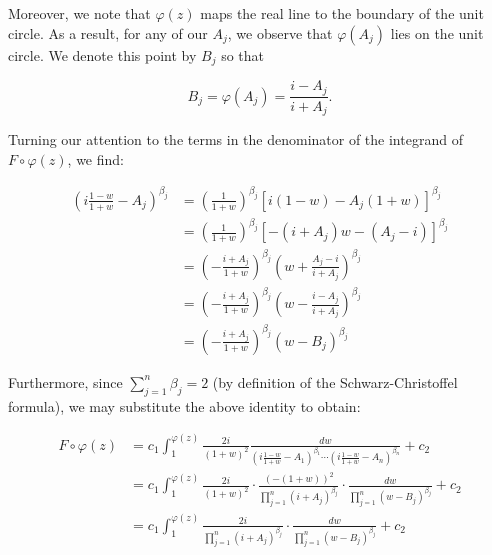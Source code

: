 \begin{solution}
  Moreover, we note that $\varphi(z)$ maps the real line to the boundary of the unit circle. As a result, for any of our 
  $A_j$, we observe that $\varphi(A_j)$ lies on the unit circle. We denote this point by $B_j$ so that

  $$
  B_j = \varphi(A_j) = \frac{i - A_j}{i + A_j}.
  $$

  \pagebreak
  Turning our attention to the terms in the denominator of the integrand of $F \circ \varphi(z)$, we find:

  \begin{align*}
    \left(i \frac{1-w}{1+w} - A_j\right)^{\beta_j} 
      &= \left(\frac{1}{1 + w}\right)^{\beta_j} \left[ i (1 - w) - A_j (1 + w) \right]^{\beta_j} \\
      &= \left(\frac{1}{1 + w}\right)^{\beta_j} \left[ -(i + A_j) w  - (A_j - i) \right]^{\beta_j} \\
      &= \left(-\frac{i + A_j}{1 + w}\right)^{\beta_j} \left( w  + \frac{A_j - i}{i + A_j} \right)^{\beta_j} \\
      &= \left(-\frac{i + A_j}{1 + w}\right)^{\beta_j} \left( w  - \frac{i - A_j}{i + A_j} \right)^{\beta_j} \\
      &= \left(-\frac{i + A_j}{1 + w}\right)^{\beta_j} \left( w  - B_j \right)^{\beta_j}
  \end{align*}

  Furthermore, since $\sum\limits_{j=1}^n \beta_j = 2$ (by definition of the Schwarz-Christoffel formula), we may 
  substitute the above identity to obtain:

  \begin{align*}
  F \circ \varphi(z) &= c_1 \int_1^{\varphi(z)} \frac{2 i }{(1 + w)^2} 
                                                \frac{dw}{\left( i \frac{1 - w}{1 + w} - A_1 \right)^{\beta_1} \cdots \left( i \frac{1 - w}{1 + w}  - A_n \right)^{\beta_n}} + c_2 \\
                     &= c_1 \int_1^{\varphi(z)} \frac{2 i }{(1 + w)^2} \cdot
                                                \frac{(-(1 + w))^2}{\prod_{j=1}^n (i + A_j)^{\beta_j}} \cdot
                                                \frac{dw}{\prod_{j=1}^n \left( w - B_j \right)^{\beta_j}} + c_2 \\
                     &= c_1 \int_1^{\varphi(z)} \frac{2 i }{\prod_{j=1}^n (i + A_j)^{\beta_j}} \cdot
                                                \frac{dw}{\prod_{j=1}^n \left( w - B_j \right)^{\beta_j}} + c_2 \\
  \end{align*}


\end{solution}
